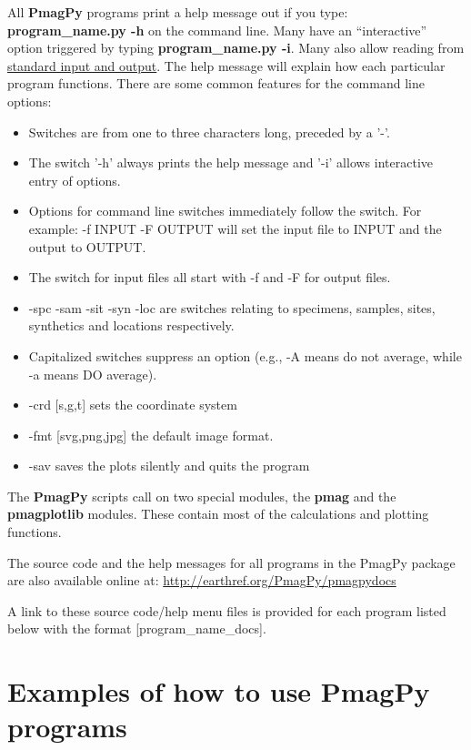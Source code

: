 \documentclass[11pt]{book}
\begin{document}
{{  All  {\bf PmagPy} programs print a help message out if you type: {\bf program\_name.py -h} on the command line.  Many have an ``interactive'' option triggered by typing {\bf program\_name.py -i}.  Many also allow reading from \href{#standard_IO }{standard input and output}.   The help message will explain how each particular program functions.  There are some common features for the command line options: 
  

\begin{itemize}
\item Switches are from one to three characters long, preceded by a '-'.  
\item The switch '-h' always prints the help message and '-i' allows interactive entry of options. 
\item  Options for command line switches immediately follow the switch.  For example:  -f INPUT -F OUTPUT will set the input file to INPUT and the output to OUTPUT.
\item  The switch for input  files all start with -f and -F for output files.
\item -spc -sam -sit -syn  -loc are switches relating to specimens, samples, sites, synthetics and locations respectively.  
\item Capitalized switches suppress an option (e.g., -A means do not average, while -a means DO average).  
\item -crd [s,g,t] sets the coordinate system 
\item -fmt [svg,png,jpg] the default image format.  
\item -sav  saves the plots silently and quits the program
\end{itemize}
\newcommand{\stt}{\small\tt}
\newcount\exnum
\outer{}
  
 The {\bf PmagPy} scripts call on two special modules, the {\bf pmag} and the {\bf pmagplotlib} modules.  These contain most of the calculations and plotting functions.  
 
 The source code and the help messages for all programs in the PmagPy package are also available online at:
 \url{http://earthref.org/PmagPy/pmagpydocs}
 
A link to these source code/help menu files is provided for each program listed below with the format [program\_name\_docs].   


\section{Examples of how to use {\bf PmagPy} programs}
\label{ex:PmagPyEx}

}}
\end{document}
